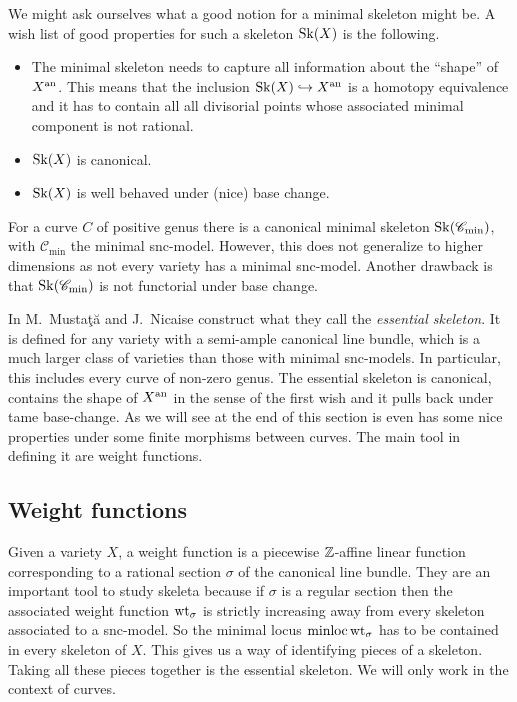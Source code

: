 We might ask ourselves what a good notion for a minimal skeleton might be. 
A wish list of good properties for such a skeleton $\operatorname{Sk}(X)$ is the following. 
\begin{itemize}
	\item The minimal skeleton needs to capture all information about the ``shape'' of $X{}^{\text{an}}$. 
		This means that the inclusion $\operatorname{Sk}(X) \hookrightarrow X{}^{\text{an}}$ is a homotopy equivalence and it has to contain all all divisorial points whose associated minimal component is not rational.
	\item $\operatorname{Sk}(X)$ is canonical. 
	\item $\operatorname{Sk}(X)$ is well behaved under (nice) base change. 
\end{itemize}
For a curve $C$ of positive genus there is a canonical minimal skeleton $\operatorname{Sk}(\mathscr C_\text{min} )$, with $\mathscr C_\text{min} $ the minimal snc-model.
However, this does not generalize to higher dimensions as not every variety has a minimal snc-model. 
Another drawback is that $\operatorname{Sk}(\mathscr C_\text{min})$ is not functorial under base change. 

In \cite{mustataWeightFunctionsNonArchimedean2015} M.\ Mustaţă and J.\ Nicaise construct what they call the \emph{essential skeleton}.
It is defined for any variety with a semi-ample canonical line bundle, which is a much larger class of varieties than those with minimal snc-models. 
In particular, this includes every curve of non-zero genus. 
The essential skeleton is canonical, contains the shape of $X{}^{\text{an}}$ in the sense of the first wish and it pulls back under tame base-change. 
As we will see at the end of this section is even has some nice properties under some finite morphisms between curves. 
The main tool in defining it are weight functions. 

\subsection{Weight functions} \label{sec:weight_functions}
Given a variety $X$, a weight function is a piecewise $\mathbb{Z}$-affine linear function corresponding to a rational section $\sigma$ of the canonical line bundle. 
They are an important tool to study skeleta because if $\sigma$ is a regular section then the associated weight function $\operatorname{wt}_\sigma$ is strictly increasing away from every skeleton associated to a snc-model. 
So the minimal locus $\operatorname{minloc} \operatorname{wt}_\sigma$ has to be contained in every skeleton of $X$. 
This gives us a way of identifying pieces of a skeleton. 
Taking all these pieces together is the essential skeleton. 
We will only work in the context of curves. 

